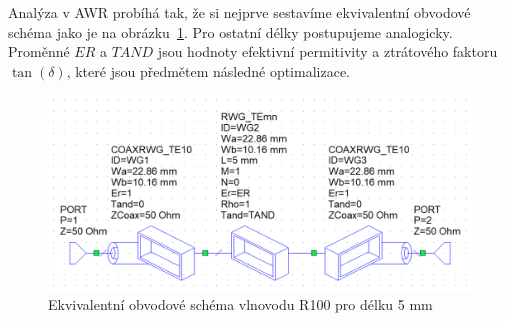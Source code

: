 \documentclass[11pt,a4paper]{article}
\begin{document}
Analýza v AWR probíhá tak, že si nejprve sestavíme ekvivalentní obvodové schéma jako je na obrázku~\ref{fig:r100-schematic}. Pro ostatní délky postupujeme analogicky. Proměnné $\mathit{ER}$ a $\mathit{TAND}$ jsou hodnoty efektivní permitivity a ztrátového faktoru $\tan(\delta)$, které jsou předmětem následné optimalizace.
\begin{figure}[!ht]
    \centering
    \includegraphics[width=.7\textwidth]{src/r100-schematic.png}
    \caption{\label{fig:r100-schematic}Ekvivalentní obvodové schéma vlnovodu R100 pro délku 5 mm}
\end{figure}
\end{document}
